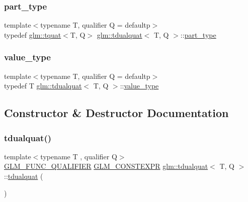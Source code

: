 \mbox{\label{structglm_1_1tdualquat_ab18b8665bbd568f9bc93ef93ed475a47}} 
\subsubsection{\texorpdfstring{part\+\_\+type}{part\_type}}
{\footnotesize\ttfamily template$<$typename T, qualifier Q = defaultp$>$ \\
typedef \mbox{\hyperlink{structglm_1_1tquat}{glm\+::tquat}}$<$T, Q$>$ \mbox{\hyperlink{structglm_1_1tdualquat}{glm\+::tdualquat}}$<$ T, Q $>$\+::\mbox{\hyperlink{structglm_1_1tdualquat_ab18b8665bbd568f9bc93ef93ed475a47}{part\+\_\+type}}}

\mbox{\label{structglm_1_1tdualquat_ab9028885c8de069ef8a61ebab77f7ccc}} 
\subsubsection{\texorpdfstring{value\+\_\+type}{value\_type}}
{\footnotesize\ttfamily template$<$typename T, qualifier Q = defaultp$>$ \\
typedef T \mbox{\hyperlink{structglm_1_1tdualquat}{glm\+::tdualquat}}$<$ T, Q $>$\+::\mbox{\hyperlink{structglm_1_1tdualquat_ab9028885c8de069ef8a61ebab77f7ccc}{value\+\_\+type}}}



\subsection{Constructor \& Destructor Documentation}
\mbox{\label{structglm_1_1tdualquat_ab2b5e57b73a6f79c56e9bcdc7d5e1607}} 
\subsubsection{\texorpdfstring{tdualquat()}{tdualquat()}\hspace{0.1cm}{\footnotesize\ttfamily [1/11]}}
{\footnotesize\ttfamily template$<$typename T , qualifier Q$>$ \\
\mbox{\hyperlink{setup_8hpp_a33fdea6f91c5f834105f7415e2a64407}{G\+L\+M\+\_\+\+F\+U\+N\+C\+\_\+\+Q\+U\+A\+L\+I\+F\+I\+ER}} \mbox{\hyperlink{setup_8hpp_a08b807947b47031d3a511f03f89645ad}{G\+L\+M\+\_\+\+C\+O\+N\+S\+T\+E\+X\+PR}} \mbox{\hyperlink{structglm_1_1tdualquat}{glm\+::tdualquat}}$<$ T, Q $>$\+::\mbox{\hyperlink{structglm_1_1tdualquat}{tdualquat}} (\begin{DoxyParamCaption}{ }\end{DoxyParamCaption})}

